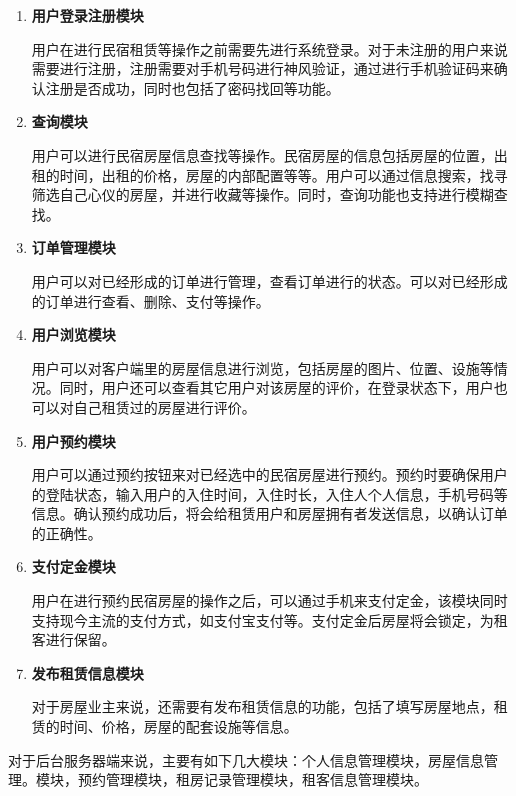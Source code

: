 \documentclass[lang=cn,11pt,a4paper,cite=authoryear]{elegantpaper}
\begin{document}
\begin{enumerate}
	\def\labelenumi{\arabic{enumi}.}
	\item
	\textbf{用户登录注册模块}
	
	用户在进行民宿租赁等操作之前需要先进行系统登录。对于未注册的用户来说需要进行注册，注册需要对手机号码进行神风验证，通过进行手机验证码来确认注册是否成功，同时也包括了密码找回等功能。
	\item
	\textbf{查询模块}
	
	用户可以进行民宿房屋信息查找等操作。民宿房屋的信息包括房屋的位置，出租的时间，出租的价格，房屋的内部配置等等。用户可以通过信息搜索，找寻筛选自己心仪的房屋，并进行收藏等操作。同时，查询功能也支持进行模糊查找。
	\item
	\textbf{订单管理模块}
	
	用户可以对已经形成的订单进行管理，查看订单进行的状态。可以对已经形成的订单进行查看、删除、支付等操作。
	\item
	\textbf{用户浏览模块}
	
	用户可以对客户端里的房屋信息进行浏览，包括房屋的图片、位置、设施等情况。同时，用户还可以查看其它用户对该房屋的评价，在登录状态下，用户也可以对自己租赁过的房屋进行评价。
	\item
	\textbf{用户预约模块}
	
	用户可以通过预约按钮来对已经选中的民宿房屋进行预约。预约时要确保用户的登陆状态，输入用户的入住时间，入住时长，入住人个人信息，手机号码等信息。确认预约成功后，将会给租赁用户和房屋拥有者发送信息，以确认订单的正确性。
	\item
	\textbf{支付定金模块}
	
	用户在进行预约民宿房屋的操作之后，可以通过手机来支付定金，该模块同时支持现今主流的支付方式，如支付宝支付等。支付定金后房屋将会锁定，为租客进行保留。
	\item
	\textbf{发布租赁信息模块}
	
	对于房屋业主来说，还需要有发布租赁信息的功能，包括了填写房屋地点，租赁的时间、价格，房屋的配套设施等信息。
\end{enumerate}

对于后台服务器端来说，主要有如下几大模块：个人信息管理模块，房屋信息管理。模块，预约管理模块，租房记录管理模块，租客信息管理模块。
\end{document}

